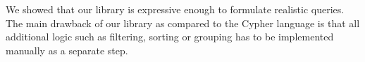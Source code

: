 
We showed that our library is expressive enough to formulate realistic queries.
The main drawback of our library as compared to the Cypher language is that all additional logic such as
filtering, sorting or grouping has to be implemented manually as a separate step.